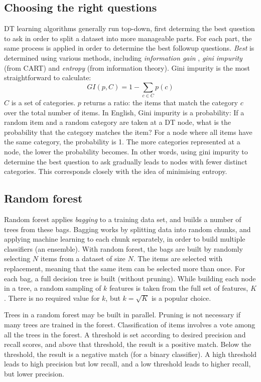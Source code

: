 \subsection{Choosing the right questions}
DT learning algorithms generally run top-down, first determing the best
question to ask in order to split a dataset into more manageable
parts.  For each part, the same process is applied in order to
determine the best followup questions.  {\it Best} is determined
using various methods, including {\it information gain}
\cite{quinlan1986}, {\it gini impurity} (from CART) and {\it entropy}
(from information theory). Gini impurity is the most straightforward
to calculate:
\begin{equation}
    GI(p, C) = 1 - \sum_{c \in C}p(c)
\end{equation}
$C$ is a set of categories. $p$ returns a ratio: the items that
match the category $c$ over the total number of items.  In English,
Gini impurity is a probability:  If a random item and
a random category are taken at a DT node, what is the probability
that the category matches the item?  For a node where all items
have the same category, the probability is 1.  The more categories
represented at a node, the lower the probability becomes.  In other
words, using gini impurity to determine the best question to ask
gradually leads to nodes with fewer distinct categories.  This
corresponds closely with the idea of minimising entropy.

\subsection{Random forest}
Random forest \cite{ho1995} applies {\it bagging} to a training data set, and
builds a number of trees from these bags.  Bagging works by
splitting data into random chunks, and applying machine learning
to each chunk separately, in order to build multiple classifiers
(an ensemble).  With random forest, the bags are built by randomly
selecting $N$ items from a dataset of size $N$.  The items are
selected with replacement, meaning that the same item can be
selected more than once.  For each bag, a full decision tree is
built (without pruning).  While building each node in a tree,
a random sampling of $k$ features is taken from the full set of
features, $K$.  There is no required value for $k$, but $k = \sqrt{K}$
is a popular choice.

Trees in a random forest may be built in parallel.  Pruning is not
necessary if many trees are trained in the forest.  Classification
of items involves a vote among all the trees in the forest.  A
threshold is set according to desired precision and recall scores,
and above that threshold, the result is a positive match.
Below the threshold, the result is a negative match (for
a binary classifier).  A high threshold leads to high precision but
low recall, and a low threshold leads to higher recall, but lower
precision.

